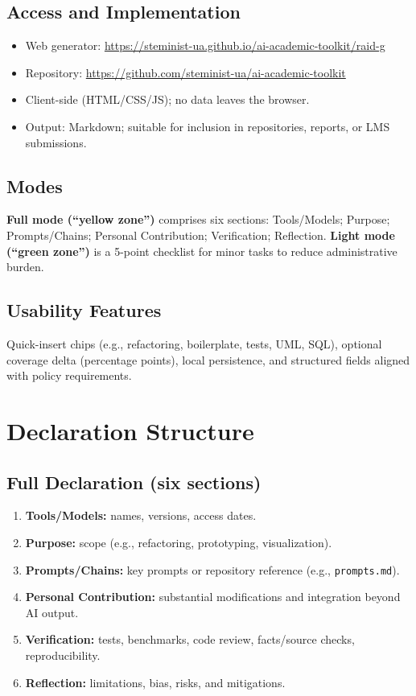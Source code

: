 \documentclass[11pt,a4paper]{article}
\newcommand{\githubrepo}{https://github.com/steminist-ua/ai-academic-toolkit}
\newcommand{\generatorurl}{https://steminist-ua.github.io/ai-academic-toolkit/raid-g}
\begin{document}
\subsection{Access and Implementation}
\begin{itemize}[leftmargin=1.2em]
  \item Web generator: \url{\generatorurl}
  \item Repository: \url{\githubrepo}
  \item Client-side (HTML/CSS/JS); no data leaves the browser.
  \item Output: Markdown; suitable for inclusion in repositories, reports, or LMS submissions.
\end{itemize}

\subsection{Modes}
\textbf{Full mode (``yellow zone'')} comprises six sections: Tools/Models; Purpose; Prompts/Chains; Personal Contribution; Verification; Reflection.  
\textbf{Light mode (``green zone'')} is a 5-point checklist for minor tasks to reduce administrative burden.

\subsection{Usability Features}
Quick-insert chips (e.g., refactoring, boilerplate, tests, UML, SQL), optional coverage delta (percentage points), local persistence, and structured fields aligned with policy requirements.

\section{Declaration Structure}
\subsection{Full Declaration (six sections)}
\begin{enumerate}[leftmargin=1.2em]
  \item \textbf{Tools/Models:} names, versions, access dates.
  \item \textbf{Purpose:} scope (e.g., refactoring, prototyping, visualization).
  \item \textbf{Prompts/Chains:} key prompts or repository reference (e.g., \texttt{prompts.md}).
  \item \textbf{Personal Contribution:} substantial modifications and integration beyond AI output.
  \item \textbf{Verification:} tests, benchmarks, code review, facts/source checks, reproducibility.
  \item \textbf{Reflection:} limitations, bias, risks, and mitigations.
\end{enumerate}
\end{document}
